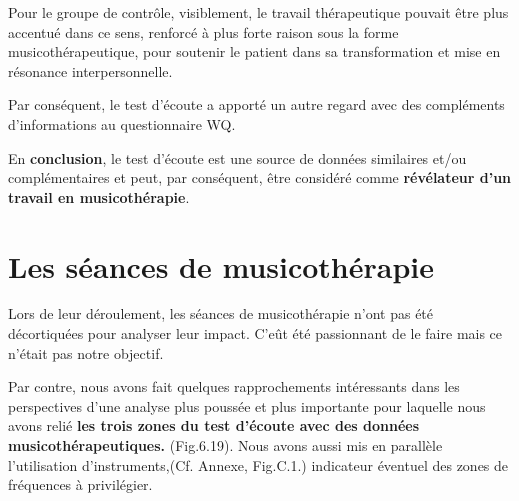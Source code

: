               Pour le groupe de contrôle, visiblement, le travail
                thérapeutique pouvait être plus accentué dans ce
                sens, renforcé à plus forte raison sous la forme musicothérapeutique, pour soutenir le
                patient dans sa transformation et mise en résonance
                interpersonnelle.


                Par conséquent,  le test d'écoute a
                apporté un autre regard avec des compléments d'informations au questionnaire
                WQ.

                En\textbf{ conclusion}, le test
                d'écoute est une source de données similaires
                et/ou complémentaires et peut, par conséquent, être
                considéré comme \textbf{révélateur d'un
                travail en musicothérapie}.

 \section{Les séances de musicothérapie}
               Lors de leur déroulement, les séances de
               musicothérapie n'ont pas été
décortiquées pour analyser leur impact. C'eût
été passionnant de le faire mais ce n'était pas notre objectif.


Par contre, nous avons fait quelques rapprochements intéressants dans les perspectives d'une analyse plus
poussée et plus importante pour laquelle nous avons  relié\textbf{ les trois zones du
test d'écoute avec des données musicothérapeutiques.}
(Fig.6.19).
Nous avons aussi mis
en parallèle  l'utilisation d'instruments,(Cf. Annexe, Fig.C.1.)
indicateur éventuel des zones de fréquences à
privilégier.




